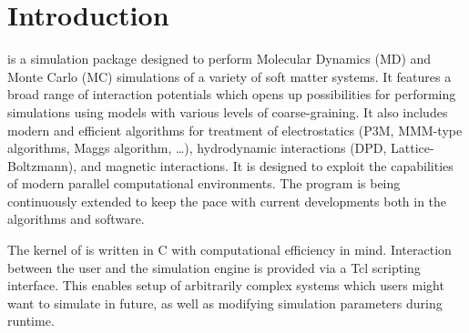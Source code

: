 %  
%   
%  
%  
%
\chapter{Introduction}
\label{chap:intro}


\es is a simulation package designed to perform Molecular Dynamics (MD)
and Monte Carlo (MC) simulations of a variety of soft matter systems.
It features a broad range of interaction potentials which opens up
possibilities for performing simulations using models with 
various levels of coarse-graining. It also includes modern and
efficient algorithms for treatment of electrostatics (P3M, MMM-type 
algorithms, Maggs algorithm, \ldots), hydrodynamic interactions
(DPD, Lattice-Boltzmann), and magnetic interactions. It is 
designed to exploit the capabilities of modern parallel computational
environments. The program is being continuously extended to keep
the pace with current developments both in the algorithms and software.

The kernel of \es is written in C with computational efficiency in mind.
Interaction between the user and the simulation engine is provided
via a Tcl scripting interface. This enables setup of arbitrarily
complex systems which users might want to simulate in future, 
as well as modifying simulation parameters during runtime.


